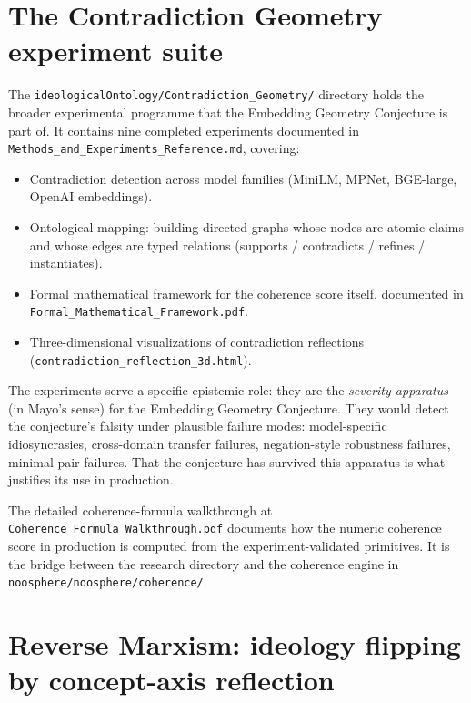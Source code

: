 \documentclass[11pt,letterpaper]{article}
\newcommand{\file}[1]{\texttt{#1}}
\begin{document}
\section{The Contradiction Geometry experiment suite}

The \file{ideologicalOntology/Contradiction\_Geometry/} directory holds the broader experimental programme that the Embedding Geometry Conjecture is part of. It contains nine completed experiments documented in \file{Methods\_and\_Experiments\_Reference.md}, covering:

\begin{itemize}[leftmargin=1.5em,itemsep=0.1em]
\item Contradiction detection across model families (MiniLM, MPNet, BGE-large, OpenAI embeddings).
\item Ontological mapping: building directed graphs whose nodes are atomic claims and whose edges are typed relations (supports / contradicts / refines / instantiates).
\item Formal mathematical framework for the coherence score itself, documented in \file{Formal\_Mathematical\_Framework.pdf}.
\item Three-dimensional visualizations of contradiction reflections (\file{contradiction\_reflection\_3d.html}).
\end{itemize}

The experiments serve a specific epistemic role: they are the \emph{severity apparatus} (in Mayo's sense) for the Embedding Geometry Conjecture. They would detect the conjecture's falsity under plausible failure modes: model-specific idiosyncrasies, cross-domain transfer failures, negation-style robustness failures, minimal-pair failures. That the conjecture has survived this apparatus is what justifies its use in production.

The detailed coherence-formula walkthrough at \file{Coherence\_Formula\_Walkthrough.pdf} documents how the numeric coherence score in production is computed from the experiment-validated primitives. It is the bridge between the research directory and the coherence engine in \file{noosphere/noosphere/coherence/}.

\section{Reverse Marxism: ideology flipping by concept-axis reflection}
\end{document}
